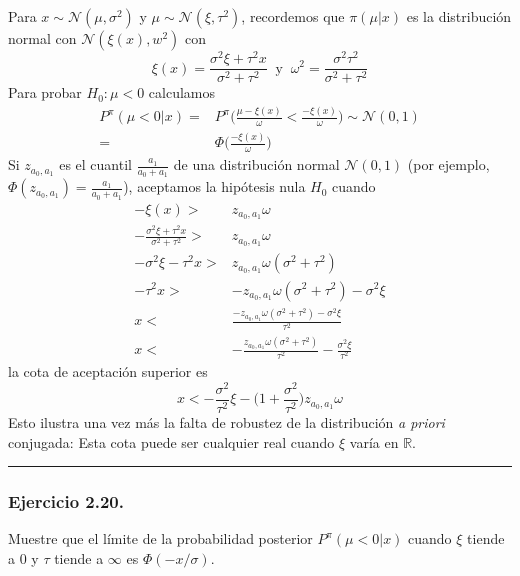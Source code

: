 \documentclass[12pt,]{article}
\begin{document}
Para \(x\sim\mathcal{N}(\mu,\sigma^2)\) y
\(\mu\sim\mathcal{N}(\xi,\tau^2)\), recordemos que \(\pi(\mu|x)\) es la
distribución normal con \(\mathcal{N}(\xi(x),w^2)\) con \[
\xi(x)=\frac{\sigma^2\xi+\tau^2x}{\sigma^2+\tau^2}\ \text{ y }\ \omega^2=\frac{\sigma^2\tau^2}{\sigma^2+\tau^2}
\] Para probar \(H_0:\mu<0\) calculamos \[
\begin{array}{rl}
P^\pi(\mu<0|x) = &  \displaystyle P^\pi\Bigg(\frac{\mu-\xi(x)}{\omega}<\frac{-\xi(x)}{\omega} \Bigg) \sim \mathcal{N}(0,1) \\
= & \displaystyle   \Phi\bigg(\frac{-\xi(x)}{\omega}\bigg)
\end{array}
\] Si \(z_{a_0,a_1}\) es el cuantil \(\frac{a_1}{a_0+a_1}\) de una
distribución normal \(\mathcal{N}(0,1)\) (por ejemplo,
\(\Phi(z_{a_0,a_1})=\frac{a_1}{a_0+a_1}\)), aceptamos la hipótesis nula
\(H_0\) cuando \[
\begin{array}{rl}
-\xi(x) > & z_{a_0,a_1} \omega \\
-\displaystyle \frac{\sigma^2\xi+\tau^2 x}{\sigma^2+\tau^2}>& z_{a_0,a_1}\omega \\
-\displaystyle \sigma^2\xi-\tau^2x>& z_{a_0,a_1}\omega(\sigma^2+\tau^2) \\
\displaystyle -\tau^2x>& - z_{a_0,a_1}\omega(\sigma^2+\tau^2) - \sigma^2\xi \\
x<& \displaystyle \frac{-z_{ a_0,a_1}\omega(\sigma^2+\tau^2) - \sigma^2\xi}{\tau^2} \\
x<& \displaystyle -\frac{z_{ a_0,a_1}\omega(\sigma^2+\tau^2)}{\tau^2} - \frac{\sigma^2\xi}{\tau^2}
\end{array}
\] la cota de aceptación superior es \[
x<-\frac{\sigma^2}{\tau^2}\xi - \bigg(1+ \frac{\sigma^2}{\tau^2} \bigg)z_{a_0,a_1}\omega
\] Esto ilustra una vez más la falta de robustez de la distribución
\emph{a priori} conjugada: Esta cota puede ser cualquier real cuando
\(\xi\) varía en \(\mathbb{R}\).

\begin{center}\rule{0.5\linewidth}{\linethickness}\end{center}

\subsubsection{Ejercicio 2.20.}\label{ejercicio-2.20.}

Muestre que el límite de la probabilidad posterior \(P^\pi(\mu<0|x)\)
cuando \(\xi\) tiende a \(0\) y \(\tau\) tiende a \(\infty\) es
\(\Phi(-x/\sigma)\).
\end{document}
